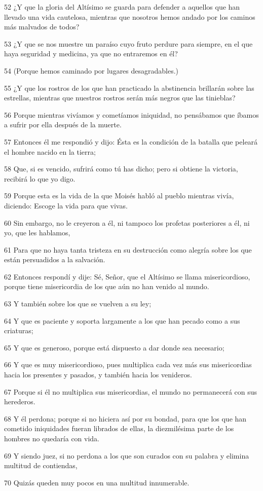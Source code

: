 \par 52 ¿Y que la gloria del Altísimo se guarda para defender a aquellos que han llevado una vida cautelosa, mientras que nosotros hemos andado por los caminos más malvados de todos?
\par 53 ¿Y que se nos muestre un paraíso cuyo fruto perdure para siempre, en el que haya seguridad y medicina, ya que no entraremos en él?
\par 54 (Porque hemos caminado por lugares desagradables.)
\par 55 ¿Y que los rostros de los que han practicado la abstinencia brillarán sobre las estrellas, mientras que nuestros rostros serán más negros que las tinieblas?
\par 56 Porque mientras vivíamos y cometíamos iniquidad, no pensábamos que íbamos a sufrir por ella después de la muerte.
\par 57 Entonces él me respondió y dijo: Ésta es la condición de la batalla que peleará el hombre nacido en la tierra;
\par 58 Que, si es vencido, sufrirá como tú has dicho; pero si obtiene la victoria, recibirá lo que yo digo.
\par 59 Porque esta es la vida de la que Moisés habló al pueblo mientras vivía, diciendo: Escoge la vida para que vivas.
\par 60 Sin embargo, no le creyeron a él, ni tampoco los profetas posteriores a él, ni yo, que les hablamos,
\par 61 Para que no haya tanta tristeza en su destrucción como alegría sobre los que están persuadidos a la salvación.
\par 62 Entonces respondí y dije: Sé, Señor, que el Altísimo se llama misericordioso, porque tiene misericordia de los que aún no han venido al mundo.
\par 63 Y también sobre los que se vuelven a su ley;
\par 64 Y que es paciente y soporta largamente a los que han pecado como a sus criaturas;
\par 65 Y que es generoso, porque está dispuesto a dar donde sea necesario;
\par 66 Y que es muy misericordioso, pues multiplica cada vez más sus misericordias hacia los presentes y pasados, y también hacia los venideros.
\par 67 Porque si él no multiplica sus misericordias, el mundo no permanecerá con sus herederos.
\par 68 Y él perdona; porque si no hiciera así por su bondad, para que los que han cometido iniquidades fueran librados de ellas, la diezmilésima parte de los hombres no quedaría con vida.
\par 69 Y siendo juez, si no perdona a los que son curados con su palabra y elimina multitud de contiendas,
\par 70 Quizás queden muy pocos en una multitud innumerable.

